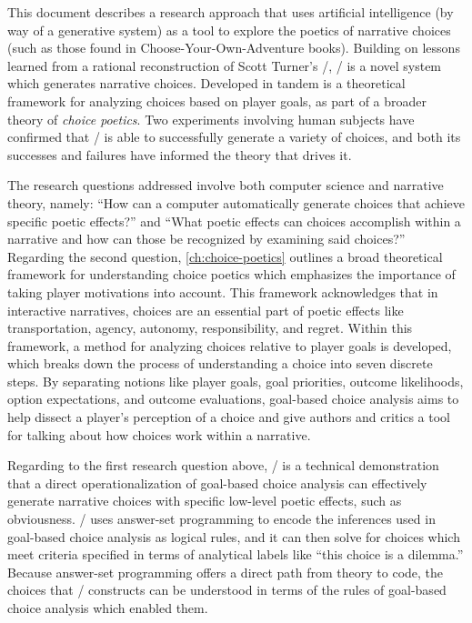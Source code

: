 This document describes a research approach that uses artificial intelligence (by way of a generative system) as a tool to explore the poetics of narrative choices (such as those found in Choose-Your-Own-Adventure books).
%
Building on lessons learned from a rational reconstruction of Scott Turner's \minstrel/, \dunyazad/ is a novel system which generates narrative choices.
%
Developed in tandem is a theoretical framework for analyzing choices based on player goals, as part of a broader theory of \emph{choice poetics}.
%
Two experiments involving human subjects have confirmed that \dunyazad/ is able to successfully generate a variety of choices, and both its successes and failures have informed the theory that drives it.


The research questions addressed involve both computer science and narrative theory, namely: ``How can a computer automatically generate choices that achieve specific poetic effects?'' and ``What poetic effects can choices accomplish within a narrative and how can those be recognized by examining said choices?''
%
Regarding the second question, \cref{ch:choice-poetics} outlines a broad theoretical framework for understanding choice poetics which emphasizes the importance of taking player motivations into account.
%
This framework acknowledges that in interactive narratives, choices are an essential part of poetic effects like transportation, agency, autonomy, responsibility, and regret.
%
Within this framework, a method for analyzing choices relative to player goals is developed, which breaks down the process of understanding a choice into seven discrete steps.
%
By separating notions like player goals, goal priorities, outcome likelihoods, option expectations, and outcome evaluations, goal-based choice analysis aims to help dissect a player's perception of a choice and give authors and critics a tool for talking about how choices work within a narrative.


Regarding to the first research question above, \dunyazad/ is a technical demonstration that a direct operationalization of goal-based choice analysis can effectively generate narrative choices with specific low-level poetic effects, such as obviousness.
%
\dunyazad/ uses answer-set programming to encode the inferences used in goal-based choice analysis as logical rules, and it can then solve for choices which meet criteria specified in terms of analytical labels like ``this choice is a dilemma.''
%
Because answer-set programming offers a direct path from theory to code, the choices that \dunyazad/ constructs can be understood in terms of the rules of goal-based choice analysis which enabled them.


